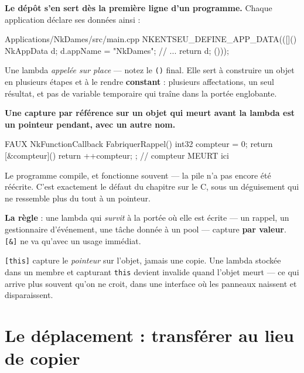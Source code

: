 \begin{nkretenir}
\textbf{Le dépôt s'en sert dès la première ligne d'un programme.} Chaque
application déclare ses données ainsi :

\begin{nkcode}{Applications/NkDames/src/main.cpp}
NKENTSEU_DEFINE_APP_DATA(([]() {
    NkAppData d;
    d.appName = "NkDames";
    // ...
    return d;
}()));
\end{nkcode}

Une lambda \emph{appelée sur place} --- notez le \texttt{()} final. Elle sert à
construire un objet en plusieurs étapes et à le rendre \textbf{constant} :
plusieurs affectations, un seul résultat, et pas de variable temporaire qui
traîne dans la portée englobante.
\end{nkretenir}

\begin{nkpiege}
\textbf{Une capture par référence sur un objet qui meurt avant la lambda est un
pointeur pendant, avec un autre nom.}

\begin{nkcode}{FAUX}
NkFunctionCallback FabriquerRappel() {
    int32 compteur = 0;
    return [&compteur]() { return ++compteur; };   // compteur MEURT ici
}
\end{nkcode}

Le programme compile, et fonctionne souvent --- la pile n'a pas encore été
réécrite. C'est exactement le défaut du chapitre sur le C, sous un déguisement
qui ne ressemble plus du tout à un pointeur.

\textbf{La règle} : une lambda qui \emph{survit} à la portée où elle est écrite
--- un rappel, un gestionnaire d'événement, une tâche donnée à un pool --- capture
\textbf{par valeur}. \texttt{[\&]} ne va qu'avec un usage immédiat.
\end{nkpiege}

\begin{nkretenir}
\texttt{[this]} capture le \emph{pointeur} sur l'objet, jamais une copie. Une
lambda stockée dans un membre et capturant \texttt{this} devient invalide quand
l'objet meurt --- ce qui arrive plus souvent qu'on ne croit, dans une interface
où les panneaux naissent et disparaissent.
\end{nkretenir}

\section{Le déplacement : transférer au lieu de copier}

